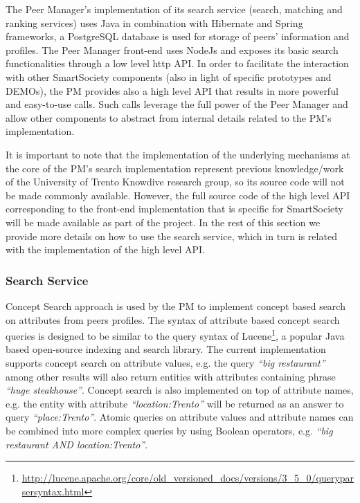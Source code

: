 The Peer Manager's implementation of its search service (search, matching and ranking services) uses Java in combination with Hibernate and Spring frameworks, a PostgreSQL database is used for storage of peers' information and profiles. The Peer Manager front-end uses NodeJs and exposes its basic search functionalities through a low level http API. In order to facilitate the interaction with other SmartSociety components (also in light of specific prototypes and DEMOs), the PM provides also a high level API that results in more powerful and easy-to-use calls. Such calls leverage the full power of the Peer Manager and allow other components to abstract from internal details related to the PM's implementation. 

It is important to note that the implementation of the underlying mechanisms at the core of the PM's search implementation represent previous knowledge/work of the University of Trento Knowdive research group, so its source code will not be made commonly available. However, the full source code of the high level API corresponding to the front-end implementation that is specific for SmartSociety will be made available as part of the project. In the rest of this section we provide more details on how to use the search service, which in turn is related with the implementation of the high level API. 

\subsubsection{Search Service}

Concept Search approach is used by the PM to implement concept based search on attributes from peers profiles.
The syntax of attribute based concept search queries is designed to be similar to the query syntax of Lucene\footnote{\url{http://lucene.apache.org/core/old_versioned_docs/versions/3_5_0/queryparsersyntax.html}}, a popular Java based open-source indexing and search library. The current implementation supports concept search on attribute values, e.g. the query \emph{``big restaurant''} among other results will also return entities with attributes containing phrase \emph{``huge steakhouse''}. Concept search is also implemented on top of attribute names, e.g. the entity with attribute \emph{``location:Trento''} will be returned as an answer to query \emph{``place:Trento''}. Atomic queries on attribute values and attribute names can be combined into more complex queries by using Boolean operators, e.g. \emph{``big restaurant AND location:Trento''}.

